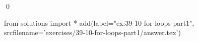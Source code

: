
\begin{ex}
  \label{ex:39-10-for-loops-part1}
  
  \qed
\end{ex}
\begin{python0}
from solutions import *
add(label="ex:39-10-for-loops-part1",
    srcfilename='exercises/39-10-for-loops-part1/answer.tex')
\end{python0}
